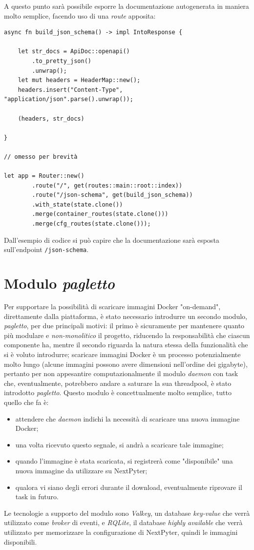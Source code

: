 \newline
A questo punto sarà possibile esporre la documentazione autogenerata in maniera molto semplice, facendo uso di una \textit{route} apposita:
\begin{verbatim}
async fn build_json_schema() -> impl IntoResponse {

    let str_docs = ApiDoc::openapi()
        .to_pretty_json()
        .unwrap();
    let mut headers = HeaderMap::new();
    headers.insert("Content-Type", "application/json".parse().unwrap());

    (headers, str_docs)

}

// omesso per brevità

let app = Router::new()
        .route("/", get(routes::main::root::index))
        .route("/json-schema", get(build_json_schema))
        .with_state(state.clone())
        .merge(container_routes(state.clone()))
        .merge(cfg_routes(state.clone()));
\end{verbatim}
Dall'esempio di codice si può capire che la documentazione sarà esposta sull'endpoint \verb|/json-schema|.
\newpage
\section{Modulo \textit{pagletto}}
Per supportare la possibilità di scaricare immagini Docker "on-demand", direttamente dalla piattaforma, è stato necessario introdurre un secondo modulo, \textit{pagletto}, per due principali motivi: il primo è sicuramente per mantenere quanto più modulare e \textit{non-monolitico} il progetto, riducendo la responsabilità che ciascun componente ha, mentre il secondo riguarda la natura stessa della funzionalità che si è voluto introdurre; scaricare immagini Docker è un processo potenzialmente molto lungo (alcune immagini possono avere dimensioni nell'ordine dei gigabyte), pertanto per non appesantire computazionalmente il modulo \textit{daemon} con task che, eventualmente, potrebbero andare a saturare la sua threadpool, è stato introdotto \textit{pagletto}.
\newline
Questo modulo è concettualmente molto semplice, tutto quello che fa è:
\begin{itemize}
    \item attendere che \textit{daemon} indichi la necessità di scaricare una nuova immagine Docker;
    \item una volta ricevuto questo segnale, si andrà a scaricare tale immagine;
    \item quando l'immagine è stata scaricata, si registrerà come "disponibile" una nuova immagine da utilizzare su NextPyter;
    \item qualora vi siano degli errori durante il download, eventualmente riprovare il task in futuro.
\end{itemize}
Le tecnologie a supporto del modulo sono \textit{Valkey}, un database \textit{key-value} che verrà utilizzato come \textit{broker} di eventi, e \textit{RQLite}, il database \textit{highly available} che verrà utilizzato per memorizzare la configurazione di NextPyter, quindi le immagini disponibili.
